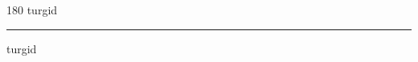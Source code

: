 
\begin{frame}
\begin{center}
\begin{turn}{180}
{\fontsize{2.5cm}{1em}\selectfont turgid}
\end{turn}
\vspace{1em}\par  
\hrule
\vspace{1em}\par  
{\fontsize{2.5cm}{1em}\selectfont turgid}
\end{center}
\end{frame}
